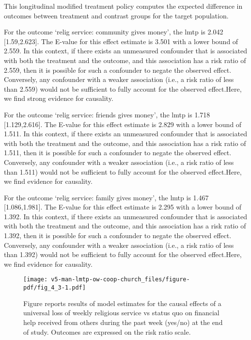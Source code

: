 \documentclass[
  singlecolumn]{article}
\begin{document}
This longitudinal modified treatment policy computes the expected
difference in outcomes between treatment and contrast groups for the
target population.

For the outcome `relig service: community gives money', the lmtp is
2.042 {[}1.59,2.623{]}. The E-value for this effect estimate is 3.501
with a lower bound of 2.559. In this context, if there exists an
unmeasured confounder that is associated with both the treatment and the
outcome, and this association has a risk ratio of 2.559, then it is
possible for such a confounder to negate the observed effect.
Conversely, any confounder with a weaker association (i.e., a risk ratio
of less than 2.559) would not be sufficient to fully account for the
observed effect.Here, we find strong evidence for causality.

For the outcome `relig service: friends gives money', the lmtp is 1.718
{[}1.129,2.616{]}. The E-value for this effect estimate is 2.829 with a
lower bound of 1.511. In this context, if there exists an unmeasured
confounder that is associated with both the treatment and the outcome,
and this association has a risk ratio of 1.511, then it is possible for
such a confounder to negate the observed effect. Conversely, any
confounder with a weaker association (i.e., a risk ratio of less than
1.511) would not be sufficient to fully account for the observed
effect.Here, we find evidence for causality.

For the outcome `relig service: family gives money', the lmtp is 1.467
{[}1.086,1.981{]}. The E-value for this effect estimate is 2.295 with a
lower bound of 1.392. In this context, if there exists an unmeasured
confounder that is associated with both the treatment and the outcome,
and this association has a risk ratio of 1.392, then it is possible for
such a confounder to negate the observed effect. Conversely, any
confounder with a weaker association (i.e., a risk ratio of less than
1.392) would not be sufficient to fully account for the observed
effect.Here, we find evidence for causality.

\newpage{}

\begin{figure}[H]

{\centering \texttt{[image: v5-man-lmtp-ow-coop-church\_files/figure-pdf/fig\_4\_3-1.pdf]}

}

\caption{Figure reports results of model estimates for the causal
effects of a universal loss of weekly religious service vs status quo on
financial help received from others during the past week (yes/no) at the
end of study. Outcomes are expressed on the risk ratio scale.}

\end{figure}%
\end{document}
